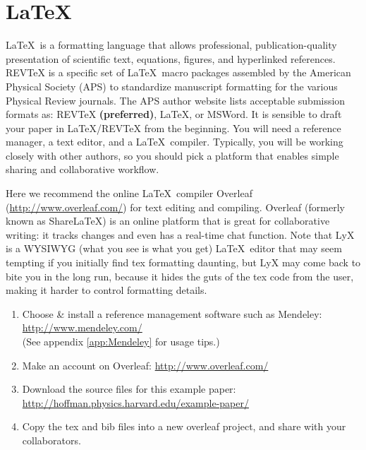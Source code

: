 \section{\label{sec:LaTeX}\LaTeX}

 \LaTeX\ is a formatting language that allows professional, publication-quality presentation of scientific text, equations, figures, and hyperlinked references. REVTeX is a specific set of \LaTeX\ macro packages assembled by the American Physical Society (APS) to standardize manuscript formatting for the various Physical Review journals. The APS author website \cite{PhysicalReview} lists acceptable submission formats as: REVTeX \textbf{(preferred)}, \LaTeX, or MSWord. It is sensible to draft your paper in \LaTeX/REVTeX from the beginning. You will need a reference manager, a text editor, and a \LaTeX\ compiler. Typically, you will be working closely with other authors, so you should pick a platform that enables simple sharing and collaborative workflow.

 Here we recommend the online \LaTeX\ compiler Overleaf (\url{http://www.overleaf.com/}) for text editing and compiling. Overleaf (formerly known as Share\LaTeX) is an online platform that is great for collaborative writing: it tracks changes and even has a real-time chat function. Note that LyX is a WYSIWYG (what you see is what you get) \LaTeX\ editor that may seem tempting if you initially find tex formatting daunting, but LyX may come back to bite you in the long run, because it hides the guts of the tex code from the user, making it harder to control formatting details.

\begin{raggedright}
\begin{enumerate}
\item Choose \& install a reference management software such as Mendeley:
\url{http://www.mendeley.com/}\\
(See appendix \ref{app:Mendeley} for usage tips.)
\item Make an account on Overleaf:
\url{http://www.overleaf.com/}\\
\item Download the source files for this example paper:
\url{http://hoffman.physics.harvard.edu/example-paper/}
\item Copy the tex and bib files into a new overleaf project, and share with your collaborators.
\end{enumerate}
\end{raggedright}
\vspace{2mm}


